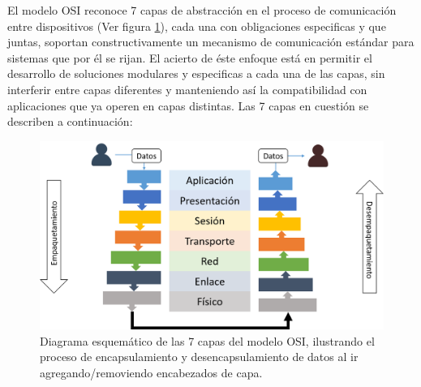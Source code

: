 El modelo OSI reconoce 7 capas de abstracción en el proceso de comunicación entre dispositivos (Ver figura \ref{fig:osi7capas}), cada una con obligaciones especificas y que juntas, soportan constructivamente un mecanismo de comunicación estándar para sistemas que por él se rijan. El acierto de éste enfoque está en permitir el desarrollo de soluciones modulares y especificas a cada una de las capas, sin interferir entre capas diferentes y manteniendo así la compatibilidad con aplicaciones que ya operen en capas distintas. Las 7 capas en cuestión se describen a continuación:

\begin{figure}[!h]
	\centering
	\includegraphics[scale=.45]{imagenes/OSI7Capas.png}
	\caption{Diagrama esquemático de las 7 capas del modelo OSI, ilustrando el proceso de encapsulamiento y desencapsulamiento de datos al ir agregando/removiendo encabezados de capa.}
	\label{fig:osi7capas}
\end{figure}

